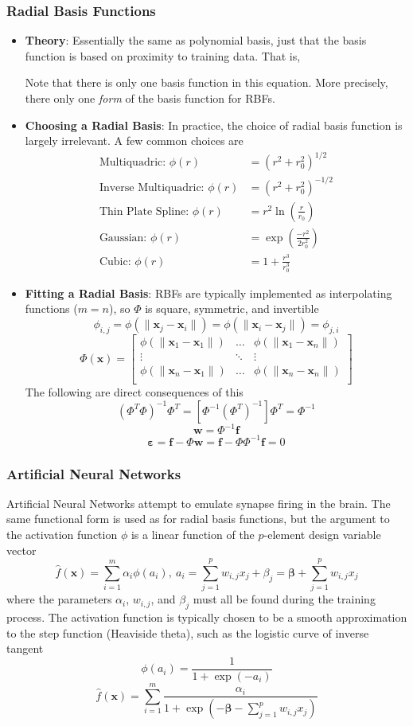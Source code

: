 \documentclass[12pt]{article}
\newcommand{\Item}[1]{\item \textbf{#1}:}
\newcommand{\CenteredBoxed}[1]{\begin{center}\boxed{#1}\end{center}}
\newcommand{\sumlim}[2]{\sum\limits_{#1}^{#2}}
\newcommand{\boldx}{\mathbf{x}}
\begin{document}
\subsubsection{Radial Basis Functions}
\begin{itemize}
\Item{Theory} Essentially the same as polynomial basis, just that the basis function is based on proximity to training data. That is,
\CenteredBoxed{\hat{f}(\boldx_j)=\sumlim{i}{n}w_i\phi(\|\boldx_j-\boldx_i\|)}
Note that there is only one basis function in this equation. More precisely, there only one \emph{form} of the basis function for RBFs.
\Item{Choosing a Radial Basis} In practice, the choice of radial basis function is largely irrelevant. A few common choices are
	\begin{align}
	\textrm{Multiquadric: }\phi(r)&=\left(r^2+r_0^2\right)^{1/2}\\
	\textrm{Inverse Multiquadric: }\phi(r)&=\left(r^2+r_0^2\right)^{-1/2}\\
	\textrm{Thin Plate Spline: }\phi(r)&=r^2\ln\left(\frac{r}{r_0}\right)\\
	\textrm{Gaussian: }\phi(r)&=\exp\left(\frac{-r^2}{2r_0^2}\right)\\
	\textrm{Cubic: }\phi(r)&=1+\frac{r^3}{r_0^3}
	\end{align}
\Item{Fitting a Radial Basis} RBFs are typically implemented as interpolating functions ($m=n$), so $\Phi$ is square, symmetric, and invertible
$$\phi_{i,j}=\phi(\|\boldx_j-\boldx_i\|)=\phi(\|\boldx_i-\boldx_j\|)=\phi_{j,i}$$
\[\Phi(\boldx) =  \begin{bmatrix}
\phi(\|\boldx_1-\boldx_1\|) & \dots & \phi(\|\boldx_1-\boldx_n\|)\\
\vdots & \ddots & \vdots\\
\phi(\|\boldx_n-\boldx_1\|) & \dots & \phi(\|\boldx_n-\boldx_n\|)\\
\end{bmatrix}\]
The following are direct consequences of this
$$(\Phi^T\Phi)^{-1}\Phi^T=\left[\Phi^{-1}(\Phi^T)^{-1}\right]\Phi^T=\Phi^{-1}$$
$$\bm{w}=\Phi^{-1}\bm{f}$$
$$\bm{\varepsilon}=\bm{f}-\Phi\bm{w}=\bm{f}-\Phi\Phi^{-1}\bm{f}=0$$
\end{itemize}
\subsubsection{Artificial Neural Networks}
Artificial Neural Networks attempt to emulate synapse firing in the brain. The same functional form is used as for radial basis functions, but the argument to the activation function $\phi$ is a linear function of the $p$-element design variable vector
$$\hat{f}(\boldx)=\sumlim{i=1}{m}\alpha_i\phi(a_i),\ a_i = \sumlim{j=1}{p}w_{i,j}x_j + \beta_j = \bm{\beta} + \sumlim{j=1}{p}w_{i,j}x_j$$
where the parameters $\alpha_i$, $w_{i,j}$, and $\beta_j$ must all be found during the training process. The activation function is typically chosen to be a smooth approximation to the step function (Heaviside theta), such as the logistic curve of inverse tangent
$$\phi(a_i)=\frac{1}{1+\exp(-a_i)}$$
$$\hat{f}(\boldx) = \sumlim{i=1}{m}\frac{\alpha_i}{1+\exp\left(-\bm{\beta}-\sumlim{j=1}{p}w_{i,j}x_j\right)}$$
\end{document}
